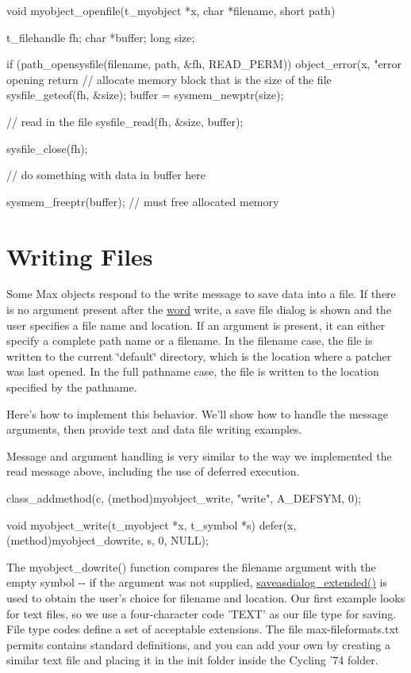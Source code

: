 \begin{DoxyCode}
    void myobject_openfile(t_myobject *x, char *filename, short path)
    {
        t_filehandle fh;
        char *buffer;
        long size;

        if (path_opensysfile(filename, path, &fh, READ_PERM)) {
            object_error(x, "error opening %
            return
        }
        // allocate memory block that is the size of the file
        sysfile_geteof(fh, &size);
        buffer = sysmem_newptr(size);

        // read in the file
        sysfile_read(fh, &size, buffer);

        sysfile_close(fh);

        // do something with data in buffer here

        sysmem_freeptr(buffer);     // must free allocated memory
    }
\end{DoxyCode}
\hypertarget{chapter_files_chapter_files_writing_files}{}\section{Writing Files}\label{chapter_files_chapter_files_writing_files}
Some Max objects respond to the write message to save data into a file. If there is no argument present after the \hyperlink{unionword}{word} write, a save file dialog is shown and the user specifies a file name and location. If an argument is present, it can either specify a complete path name or a filename. In the filename case, the file is written to the current \char`\"{}default\char`\"{} directory, which is the location where a patcher was last opened. In the full pathname case, the file is written to the location specified by the pathname.

Here's how to implement this behavior. We'll show how to handle the message arguments, then provide text and data file writing examples.

Message and argument handling is very similar to the way we implemented the read message above, including the use of deferred execution.


\begin{DoxyCode}
    class_addmethod(c, (method)myobject_write, "write", A_DEFSYM, 0);

    void myobject_write(t_myobject *x, t_symbol *s)
    {
        defer(x, (method)myobject_dowrite, s, 0, NULL);
    }
\end{DoxyCode}


The myobject\_\-dowrite() function compares the filename argument with the empty symbol -\/-\/ if the argument was not supplied, \hyperlink{group__files_gad43815aaa436e518a5cc68d2a340e4de}{saveasdialog\_\-extended()} is used to obtain the user's choice for filename and location. Our first example looks for text files, so we use a four-\/character code 'TEXT' as our file type for saving. File type codes define a set of acceptable extensions. The file max-\/fileformats.txt permits contains standard definitions, and you can add your own by creating a similar text file and placing it in the init folder inside the Cycling '74 folder.



